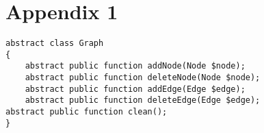 \section*{Appendix 1}
\label{sec:app1}

\begin{lstlisting}
abstract class Graph
{
    abstract public function addNode(Node $node);
    abstract public function deleteNode(Node $node);
    abstract public function addEdge(Edge $edge);
    abstract public function deleteEdge(Edge $edge);
abstract public function clean();
}
\end{lstlisting}